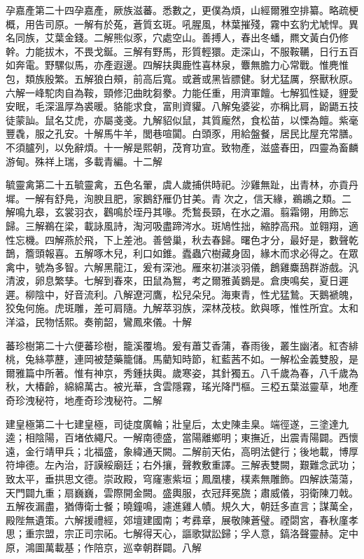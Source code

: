\begin{pinyinscope}
孕嘉產第二十四孕嘉產，厥族滋蕃。悉數之，更僕為煩，山經爾雅空排纂。略疏梗概，用告司原。一解有於菟，蒼質玄斑。吼腥風，林葉摧殘，霧中玄豹尤虓悍。異名同族，艾葉金錢。二解熊似豕，穴處空山。善搏人，春出冬蟠，羆文黃白仍修幹。力能拔木，不畏戈鋋。三解有野馬，形質輕獧。走深山，不服鞍韉，日行五百如奔電。野騾似馬，亦產遐邊。四解扶輿鹿性喜林泉，麞無膽力心常戰。惟麂惟包，類族殷繁。五解狼白頰，前高后寬。或蒼或黑皆膘健。豺尤猛厲，祭獸秋原。六解一峰駝肉自為鞍，頸修氾曲眈芻豢。力能任重，用濟軍饘。七解狐性疑，貍愛安眠，毛深溫厚為裘暖。貉能求食，富則資貛。八解兔婆娑，亦稱比肩，鼢鼯五技徒蒙訕。鼠名艾虎，亦屬戔戔。九解貂似鼠，其質龐然，食松苗，以慄為饘。紫毫豐毳，服之孔安。十解馬牛羊，閭巷喧闐。白頭豕，用給盤餐，居民比屋充常膳。不須臚列，以免辭煩。十一解是熙朝，茂育功宣。致物產，滋盛春田，四靈為畜麟游甸。殊祥上瑞，多載青編。十二解

毓靈禽第二十五毓靈禽，五色名翬，虞人歲捕供時祀。沙雞無趾，出青林，亦貢丹墀。一解有舒鳧，洵腴且肥，家鵝舒雁仍甘美。青𪅂次之，信天緣，鵜鶘之類。二解鳴九皋，玄裳羽衣，鸛鳴於垤丹其喙。禿鶖長頸，在水之湄。翦霜翎，用飾忘歸。三解鵜在梁，載詠風詩，淘河吸盡蹄涔水。斑鳩性拙，縮脖高飛。並翱翔，適性忘機。四解燕於飛，下上差池。善營巢，秋去春歸。曙色才分，最好是，數聲乾鵲，簷頭報喜。五解啄木兒，利口如錐。蠹蟲穴樹藏身固，緣木而求必得之。在眾禽中，號為多智。六解黑龍江，爰有深池。雁來初湛淡羽儀，鶬雞麋鴰群游戲。汎清波，卵息繁孳。七解到春來，田鼠為鴽，考之爾雅黃鷃是。倉庚鳴矣，夏日遲遲。柳陰中，好音流利。八解遼河鷹，松兒朵兒。海東青，性尤猛鷙。天鵝褫魄，狡兔何施。虎斑雕，差可肩隨。九解萃羽族，深林茂枝。飲與啄，惟性所宜。太和洋溢，民物恬熙。奏箾韶，鸞鳳來儀。十解

蕃珍樹第二十六便蕃珍樹，籠溪覆塢。爰有蕭艾香蒲，春雨後，叢生幽渚。紅杏緋桃，兔絲葶藶，連岡被楚藥籠儲。馬藺知時節，紅藍茜不如。一解松金義雙股，是爾雅篇中所著。惟有神京，秀鍾扶輿。歲寒姿，其針獨五。八千歲為春，八千歲為秋，大椿齡，綿綿萬古。被光華，含雲隱霧，瑤光降鬥樞。三椏五葉滋靈草，地產奇珍洩秘符，地產奇珍洩秘符。二解

建皇極第二十七建皇極，司徒度廣輪；壯皇后，太史陳圭臬。端徑遂，三塗達九逵；相陰陽，百堵依繩尺。一解南德盛，當陽離鄉明；東撫近，出震青陽闢。西懷遠，金行靖甲兵；北福盛，象緯通天闕。二解前天佑，高明法健行；後地載，博厚符坤德。左內治，訏謨綏廟廷；右外攘，聲教敷重譯。三解表雙闕，艱難念武功；致太平，垂拱思文德。崇政殿，穹窿憲紫垣；鳳凰樓，樸素無雕飾。四解詄蕩蕩，天門闢九重；扇巍巍，雲際開金闕。盛輿服，衣冠拜冕旒；肅威儀，羽衛陳刀戟。五解夜漏盡，猶傳衛士餐；曉鐘鳴，遽進雞人幘。規久大，朝廷多直言；謀萬全，殿陛無遺策。六解援禮經，郊壇建國南；考彞章，展敬陳蒼璧。禋閟宮，春秋廑孝思；重宗盟，宗正司宗祏。七解得天心，謳歌獄訟歸；孚人意，鎬洛聲靈赫。定中原，鴻圖萬載基；作陪京，巡幸朝群闢。八解


\end{pinyinscope}
